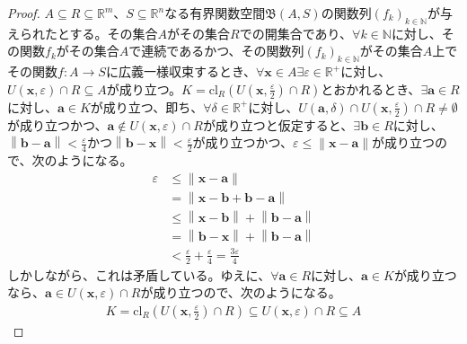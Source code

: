\documentclass[dvipdfmx]{jsarticle}
\begin{document}
\begin{proof}
$A \subseteq R \subseteq \mathbb{R}^{m}$、$S \subseteq \mathbb{R}^{n}$なる有界関数空間$\mathfrak{B}(A,S)$の関数列$\left( f_{k} \right)_{k \in \mathbb{N}}$が与えられたとする。その集合$A$がその集合$R$での開集合であり、$\forall k \in \mathbb{N}$に対し、その関数$f_{k}$がその集合$A$で連続であるかつ、その関数列$\left( f_{k} \right)_{k \in \mathbb{N}}$がその集合$A$上でその関数$f:A \rightarrow S$に広義一様収束するとき、$\forall\mathbf{x} \in A\exists\varepsilon \in \mathbb{R}^{+}$に対し、$U\left( \mathbf{x},\varepsilon \right) \cap R \subseteq A$が成り立つ。$K = \mathrm{cl}_{R}\left( U\left( \mathbf{x},\frac{\varepsilon}{2} \right) \cap R \right)$とおかれるとき、$\exists\mathbf{a} \in R$に対し、$\mathbf{a} \in K$が成り立つ、即ち、$\forall\delta \in \mathbb{R}^{+}$に対し、$U\left( \mathbf{a},\delta \right) \cap U\left( \mathbf{x},\frac{\varepsilon}{2} \right) \cap R \neq \emptyset$が成り立つかつ、$\mathbf{a} \notin U\left( \mathbf{x},\varepsilon \right) \cap R$が成り立つと仮定すると、$\exists\mathbf{b} \in R$に対し、$\left\| \mathbf{b} - \mathbf{a} \right\| < \frac{\varepsilon}{4}$かつ$\left\| \mathbf{b} - \mathbf{x} \right\| < \frac{\varepsilon}{2}$が成り立つかつ、$\varepsilon \leq \left\| \mathbf{x} - \mathbf{a} \right\|$が成り立つので、次のようになる。
\begin{align*}
\varepsilon &\leq \left\| \mathbf{x} - \mathbf{a} \right\|\\
&= \left\| \mathbf{x} - \mathbf{b} + \mathbf{b} - \mathbf{a} \right\|\\
&\leq \left\| \mathbf{x} - \mathbf{b} \right\| + \left\| \mathbf{b} - \mathbf{a} \right\|\\
&= \left\| \mathbf{b} - \mathbf{x} \right\| + \left\| \mathbf{b} - \mathbf{a} \right\|\\
&< \frac{\varepsilon}{2} + \frac{\varepsilon}{4} = \frac{3\varepsilon}{4}
\end{align*}
しかしながら、これは矛盾している。ゆえに、$\forall\mathbf{a} \in R$に対し、$\mathbf{a} \in K$が成り立つなら、$\mathbf{a} \in U\left( \mathbf{x},\varepsilon \right) \cap R$が成り立つので、次のようになる。
\begin{align*}
K = \mathrm{cl}_{R}\left( U\left( \mathbf{x},\frac{\varepsilon}{2} \right) \cap R \right) \subseteq U\left( \mathbf{x},\varepsilon \right) \cap R \subseteq A
\end{align*}

\end{proof}
\end{document}
